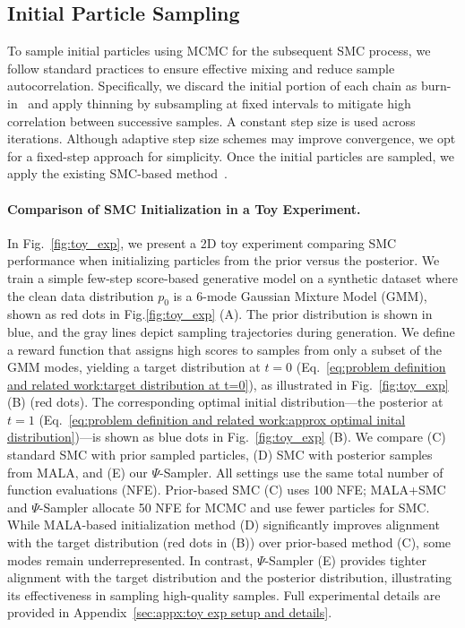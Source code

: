 

\subsection{Initial Particle Sampling}
To sample initial particles using MCMC for the subsequent SMC process, we follow standard practices to ensure effective mixing and reduce sample autocorrelation. Specifically, we discard the initial portion of each chain as burn-in~\cite{216920b6-7e32-3767-8d02-cac746ef1295burnin} and apply thinning by subsampling at fixed intervals to mitigate high correlation between successive samples. A constant step size is used across iterations. Although adaptive step size schemes may improve convergence, we opt for a fixed-step approach for simplicity. Once the initial particles are sampled, we apply the existing SMC-based method~\cite{wu2023tds, uehara2025inference}.

\vspace{-0.2cm}
\paragraph{Comparison of SMC Initialization in a Toy Experiment.}

In Fig.~\ref{fig:toy_exp}, we present a 2D toy experiment comparing SMC performance when initializing particles from the prior versus the posterior. We train a simple few-step score-based generative model on a synthetic dataset where the clean data distribution $p_0$ is a 6-mode Gaussian Mixture Model (GMM), shown as red dots in Fig.\ref{fig:toy_exp} (A). The prior distribution is shown in blue, and the gray lines depict sampling trajectories during generation.
We define a reward function that assigns high scores to samples from only a subset of the GMM modes, yielding a target distribution at $t = 0$ (Eq.~\ref{eq:problem definition and related work:target distribution at t=0}), as illustrated in Fig.~\ref{fig:toy_exp} (B) (red dots). The corresponding optimal initial distribution—the posterior at $t = 1$ (Eq.~\ref{eq:problem definition and related work:approx optimal inital distribution})—is shown as blue dots in Fig.~\ref{fig:toy_exp} (B).
We compare (C) standard SMC with prior sampled particles, (D) SMC with posterior samples from MALA, and (E) our $\Psi$-Sampler. All settings use the same total number of function evaluations (NFE). Prior-based SMC (C) uses 100 NFE; MALA+SMC and $\Psi$-Sampler allocate 50 NFE for MCMC and use fewer particles for SMC.
While MALA-based initialization method (D) significantly improves alignment with the target distribution (red dots in (B)) over prior-based method (C), some modes remain underrepresented. In contrast, $\Psi$-Sampler (E) provides tighter alignment with the target distribution and the posterior distribution, illustrating its effectiveness in sampling high-quality samples. 
Full experimental details are provided in Appendix~\ref{sec:appx:toy exp setup and details}.
